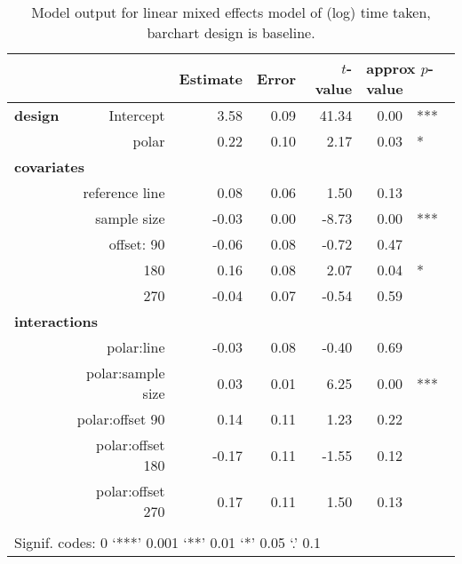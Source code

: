 \begin{table}[ht]
\begin{center}
\resizebox{\linewidth}{!} {
\begin{tabular}{lrrrrrl}
  \hline
& & Estimate & Error & $t$-value & \multicolumn{2}{l}{approx $p$-value} \\   \hline
\bf design & Intercept & 3.58 & 0.09 & 41.34 & 0.00 & ***\\ 
&  polar & 0.22 & 0.10 & 2.17 & 0.03 & * \\ [2pt]
\multicolumn{2}{l}{\bf covariates}\\
&reference line & 0.08 & 0.06 & 1.50 & 0.13 \\ [1pt]
 & sample size & -0.03 & 0.00 & -8.73 & 0.00 & ***\\ [1pt]
&  offset: 90 & -0.06 & 0.08 & -0.72 & 0.47 \\ 
& 180 & 0.16 & 0.08 & 2.07 & 0.04 & *\\ 
&  270 & -0.04 & 0.07 & -0.54 & 0.59 \\ [2pt]
\multicolumn{2}{l}{\bf interactions}\\
&  polar:line & -0.03 & 0.08 & -0.40 & 0.69 \\ [1pt]
&    polar:sample size & 0.03 & 0.01 & 6.25 & 0.00 & ***\\ [1pt]
&    polar:offset 90 & 0.14 & 0.11 & 1.23 & 0.22 \\ 
&    polar:offset 180 & -0.17 & 0.11 & -1.55 & 0.12 \\ 
&    polar:offset 270 & 0.17 & 0.11 & 1.50 & 0.13 \\ 
   \hline
\\[-5pt]
   \multicolumn{5}{l}{Signif. codes:  0 `***' 0.001 `**' 0.01 `*' 0.05 `.' 0.1}
\end{tabular}}
\end{center}
\caption{\label{tbl:time} Model output for linear mixed effects model of (log) time taken, barchart design is baseline. }
\end{table}



